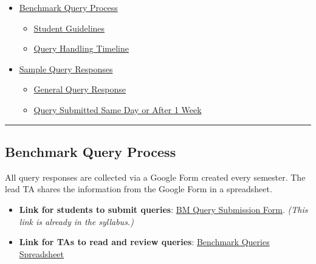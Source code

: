 \documentclass[
]{article}
\providecommand{\tightlist}{%
  \setlength{\itemsep}{0pt}\setlength{\parskip}{0pt}}
\begin{document}
\begin{itemize}
\tightlist
\item
  \protect\hyperlink{benchmark-query-process}{Benchmark Query Process}

  \begin{itemize}
  \tightlist
  \item
    \protect\hyperlink{student-guidelines}{Student Guidelines}\\
  \item
    \protect\hyperlink{query-handling-timeline}{Query Handling Timeline}\\
  \end{itemize}
\item
  \protect\hyperlink{sample-query-responses}{Sample Query Responses}

  \begin{itemize}
  \tightlist
  \item
    \protect\hyperlink{general-query-response}{General Query Response}\\
  \item
    \protect\hyperlink{query-submitted-same-day-or-after-1-week}{Query Submitted Same Day or After 1 Week}
  \end{itemize}
\end{itemize}

\begin{center}\rule{0.5\linewidth}{0.5pt}\end{center}

\hypertarget{benchmark-query-process}{%
\subsection{Benchmark Query Process}\label{benchmark-query-process}}

All query responses are collected via a Google Form created every semester. The lead TA shares the information from the Google Form in a spreadsheet.

\begin{itemize}
\tightlist
\item
  \textbf{Link for students to submit queries}: \href{https://forms.gle/6EjdNQLnpWBTX2H26}{BM Query Submission Form}. \emph{(This link is already in the syllabus.)}\\
\item
  \textbf{Link for TAs to read and review queries}: \href{https://docs.google.com/spreadsheets/d/1eyxaN9Psqle0u9mQ1rSq1LcSYIlrxo-ldgFzc4BlmRk/edit?usp=sharing}{Benchmark Queries Spreadsheet}
\end{itemize}
\end{document}

